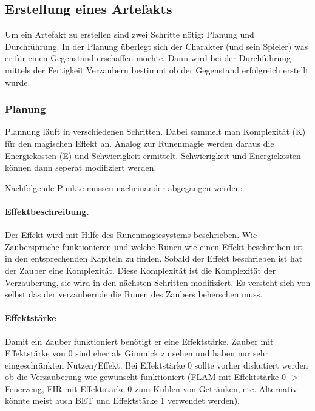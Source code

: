 \documentclass{article}
\begin{document}
\begin{center}
\subsection{Erstellung eines Artefakts}
\end{center}

Um ein Artefakt zu erstellen sind zwei Schritte nötig: Planung und Durchführung. In der Planung überlegt sich der
Charakter (und sein Spieler) was er für einen Gegenstand erschaffen möchte. Dann wird bei der Durchführung mittels
der Fertigkeit Verzaubern bestimmt ob der Gegenstand erfolgreich erstellt wurde.

\subsubsection{Planung}

Plannung läuft in verschiedenen Schritten. Dabei sammelt man Komplexität (K) für den magischen Effekt an.
Analog zur Runenmagie werden daraus die Energiekosten (E) und Schwierigkeit ermittelt. Schwierigkeit und
Energiekosten können dann seperat modifiziert werden.

Nachfolgende Punkte müssen nacheinander abgegangen werden:

\paragraph{Effektbeschreibung.}

Der Effekt wird mit Hilfe des Runenmagiesystems beschrieben. Wie Zaubersprüche funktionieren und welche Runen wie
einen Effekt beschreiben ist in den entsprechenden Kapiteln zu finden. Sobald der Effekt beschrieben ist hat der
Zauber eine Komplexität. Diese Komplexität ist die Komplexität der Verzauberung, sie wird in den nächsten Schritten
modifiziert. Es versteht sich von selbst das der verzaubernde die Runen des Zaubers beherschen muss.

\paragraph{Effektstärke}

Damit ein Zauber funktioniert benötigt er eine Effektstärke. Zauber mit Effektstärke von 0 sind eher als Gimmick zu
sehen und haben nur sehr eingeschränkten Nutzen/Effekt. Bei Effektstärke 0 sollte vorher diskutiert werden ob die
Verzauberung wie gewünscht funktioniert (FLAM mit Effektstärke 0 -> Feuerzeug, FIR mit Effektstärke 0 zum Kühlen von
Getränken, etc. Alternativ könnte meist auch BET und Effektstärke 1 verwendet werden).
\end{document}
